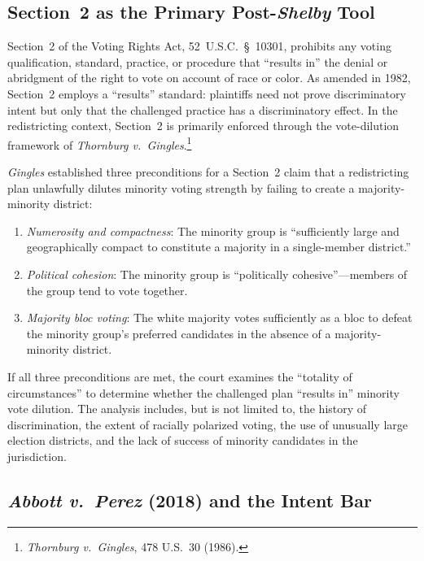 \label{sec:methodology}

\subsection{Section~2 as the Primary Post-\textit{Shelby} Tool}

Section~2 of the Voting Rights Act, 52~U.S.C.~\S~10301, prohibits any
voting qualification, standard, practice, or procedure that ``results in''
the denial or abridgment of the right to vote on account of race or color.
As amended in 1982, Section~2 employs a ``results'' standard: plaintiffs
need not prove discriminatory intent but only that the challenged practice
has a discriminatory effect. In the redistricting context, Section~2 is
primarily enforced through the vote-dilution framework of
\textit{Thornburg v.\ Gingles}.\footnote{\textit{Thornburg v.\ Gingles},
478 U.S.\ 30 (1986).}

\textit{Gingles} established three preconditions for a Section~2 claim
that a redistricting plan unlawfully dilutes minority voting strength
by failing to create a majority-minority district:

\begin{enumerate}
\item \textit{Numerosity and compactness}: The minority group is ``sufficiently
  large and geographically compact to constitute a majority in a
  single-member district.''

\item \textit{Political cohesion}: The minority group is ``politically
  cohesive''---members of the group tend to vote together.

\item \textit{Majority bloc voting}: The white majority votes sufficiently
  as a bloc to defeat the minority group's preferred candidates in the
  absence of a majority-minority district.
\end{enumerate}

If all three preconditions are met, the court examines the ``totality of
circumstances'' to determine whether the challenged plan ``results in''
minority vote dilution. The analysis includes, but is not limited to,
the history of discrimination, the extent of racially polarized voting,
the use of unusually large election districts, and the lack of success
of minority candidates in the jurisdiction.

\subsection{\textit{Abbott v.\ Perez} (2018) and the Intent Bar}

